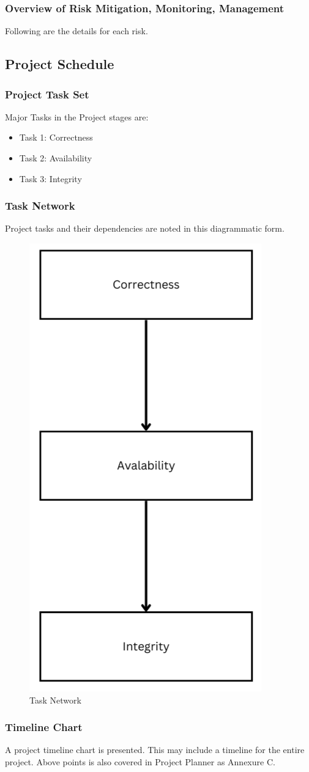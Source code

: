 \documentclass[oneside, 12pt]{book}
\begin{document}
			\subsubsection{Overview of Risk Mitigation, Monitoring, Management}
				Following are the details for each risk.
		\subsection{Project Schedule}
			\subsubsection{Project Task Set}
				Major Tasks in the Project stages are:
				\begin{itemize}
					\item Task 1: Correctness
					\item Task 2: Availability
					\item Task 3: Integrity 
				\end{itemize}
			\subsubsection{Task Network}
				Project tasks and their dependencies are noted in this diagrammatic form.
				\begin{figure}[H]
					\centering
					\includegraphics[width=0.4\linewidth]{./Resources/task-network.png}
				    \caption{Task Network}
				    \label{fig:task-network}
				\end{figure}
			\subsubsection{Timeline Chart}
				A project timeline chart is presented. This may include a timeline for the entire project. Above points is also covered in Project Planner as Annexure C.
\end{document}
